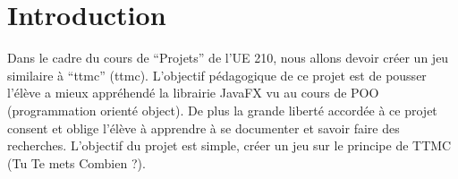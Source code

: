 \newpage
\section*{Introduction}
\label{sec:intro}
Dans le cadre du cours de ``Projets'' de l'UE 210, nous allons devoir créer un jeu similaire à ``\acrlong{ttmc}'' (\acrshort{ttmc}). L'objectif pédagogique de ce projet est de pousser l'élève a mieux appréhendé la librairie JavaFX vu au cours de 
POO (programmation orienté object). De plus la grande liberté accordée à ce projet consent et oblige l'élève à apprendre à se documenter et savoir faire des recherches.  L'objectif du projet est simple, créer un jeu sur le principe de TTMC (Tu Te 
mets Combien ?).  
